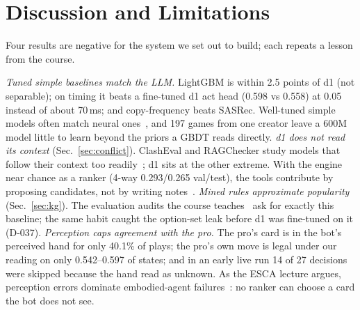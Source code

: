 \documentclass[conference]{IEEEtran}
\begin{document}
\section{Discussion and Limitations}
\label{sec:disc}

Four results are negative for the system we set out to build; each repeats a lesson from the course.

\emph{Tuned simple baselines match the LLM.} LightGBM is within 2.5 points of d1 (not separable); on timing it beats a fine-tuned d1 act head (0.598 vs 0.558) at 0.05 instead of about 70\,ms; and copy-frequency beats SASRec. Well-tuned simple models often match neural ones~\cite{rendle2020ncfvsmf,lim2026l13}, and 197 games from one creator leave a 600M model little to learn beyond the priors a GBDT reads directly. %
\emph{d1 does not read its context} (Sec.~\ref{sec:conflict}). ClashEval and RAGChecker study models that follow their context too readily~\cite{wu2024clasheval,ru2024ragchecker}; d1 sits at the other extreme. With the engine near chance as a ranker (4-way 0.293/0.265 val/test), the tools contribute by proposing candidates, not by writing notes~\cite{lim2026l13}. %
\emph{Mined rules approximate popularity} (Sec.~\ref{sec:kg}). The evaluation audits the course teaches~\cite{ruffinelli2020olddog,sun2020reevaluation} ask for exactly this baseline; the same habit caught the option-set leak before d1 was fine-tuned on it (D-037). %
\emph{Perception caps agreement with the pro.} The pro's card is in the bot's perceived hand for only 40.1\% of plays; the pro's own move is legal under our reading on only 0.542--0.597 of states; and in an early live run 14 of 27 decisions were skipped because the hand read as unknown. As the ESCA lecture argues, perception errors dominate embodied-agent failures~\cite{huang2025esca,cap6938L06C}: no ranker can choose a card the bot does not see. %
\end{document}
